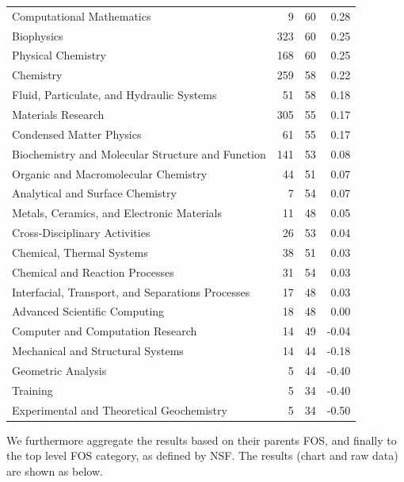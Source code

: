 \documentclass{sig-alternate}
\begin{document}
\begin{table}[h]
\begin{tiny}
\begin{tabular}{p{}rrr}
Computational Mathematics &   9 &   60 &  0.28 \\
Biophysics &  323 &    60 &  0.25 \\
Physical Chemistry &  168 &    60 &  0.25 \\
Chemistry &   259 &    58 &  0.22 \\
Fluid, Particulate, and Hydraulic Systems &   51 &  58 & 0.18 \\
Materials Research &  305 &    55 &  0.17 \\
Condensed Matter Physics &    61 &  55 &  0.17 \\
Biochemistry and Molecular Structure and Function &   141 &    53 &  0.08 \\
Organic and Macromolecular Chemistry &   44 &  51 &  0.07 \\
Analytical and Surface Chemistry &    7 &   54 &  0.07 \\
Metals, Ceramics, and Electronic Materials &  11 &  48 & 0.05 \\
Cross-Disciplinary Activities &  26 &  53 &  0.04 \\
Chemical, Thermal Systems &   38 &  51 &  0.03 \\
Chemical and Reaction Processes & 31 &  54 &  0.03 \\
Interfacial, Transport, and Separations Processes &   17 &  48 &  0.03 \\
Advanced Scientific Computing &  18 &  48 &  0.00 \\
Computer and Computation Research &   14 &  49 &  -0.04 \\
Mechanical and Structural Systems &   14 &  44 &  -0.18 \\
Geometric Analysis &  5 &   44 &  -0.40 \\
Training &    5 &   34 &  -0.40 \\
Experimental and Theoretical Geochemistry &   5 &   34 & -0.50 \\
\end{tabular}
\end{tiny}
\end{table}

We furthermore aggregate the results based on their parents FOS, and
finally to the top level FOS category, as defined by NSF. The results
(chart and raw data) are shown as below.
\end{document}
